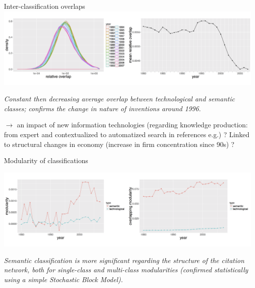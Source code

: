 \documentclass{beamer}
\begin{document}
\begin{frame}{Inter-classification overlaps}
   \centering
    \includegraphics[width=\textwidth]{figures/Fig8.png}
    
    \medskip

    \textit{Constant then decreasing average overlap between technological and semantic classes; confirms the change in nature of inventions around 1996.} 
    
    \smallskip
    
    $\rightarrow$ an impact of new information technologies (regarding knowledge production: from expert and contextualized to automatized search in references e.g.) ? Linked to structural changes in economy (increase in firm concentration since 90s) ?
    
\end{frame}

\begin{frame}{Modularity of classifications} \label{slide:modularity}
\hyperlink{slide:modularity_def}{}

   \centering
    \includegraphics[width=\textwidth]{figures/Fig9.png}
    
    \medskip
    
    \textit{Semantic classification is more significant regarding the structure of the citation network, both for single-class and multi-class modularities (confirmed statistically using a simple Stochastic Block Model).}
    
\end{frame}
\end{document}

